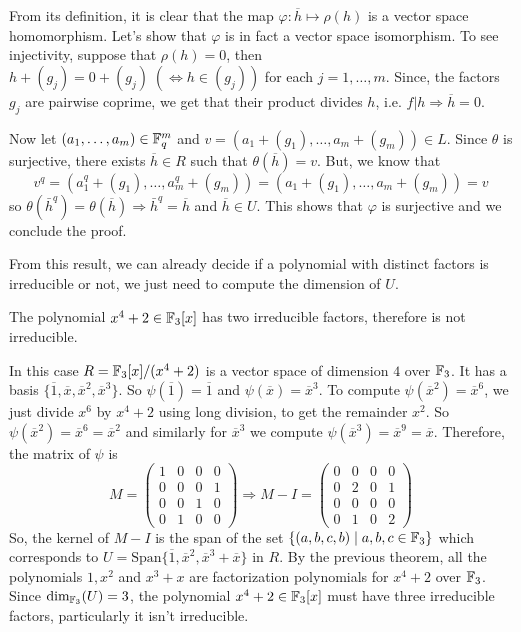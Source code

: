 From its definition, it is clear that the map $\varphi:\overline{h}\mapsto\rho(h)$ is a vector space homomorphism. Let's show that $\varphi$ is in fact a vector space isomorphism. To see injectivity, suppose that $\rho(h)=0$, then $h+(g_j)=0+(g_j)\;(\iff h\in (g_j))$ for each $j=1,\dots,m$. Since, the factors $g_j$ are pairwise coprime, we get that their product divides $h$, i.e. $f| h\Rightarrow\overline{h}=0$.\par
Now let $(a_1,\dots,a_m)\in\mathbb{F}_q^m$ and $v=(a_1+(g_1),\dots,a_m+(g_m))\in L$. Since $\theta$ is surjective, there exists $\overline{h}\in R$ such that $\theta(\overline{h})=v$. But, we know that
\begin{equation}
    v^q=(a_1^q+(g_1),\dots,a_m^q+(g_m))=(a_1+(g_1),\dots,a_m+(g_m)) = v
\end{equation}
so $\theta(\bar{h}^{q})=\theta(\overline{h})\Rightarrow \bar{h}^{q}=\overline{h}$ and $\overline{h}\in U$. This shows that $\varphi$ is surjective and we conclude the proof.\par
From this result, we can already decide if a polynomial with distinct factors is irreducible or not, we just need to compute the dimension of $U$.
\begin{dang}
    \begin{example}\label{example: x4+2 is not irreducible over F3}
        The polynomial $x^4+2\in\mathbb{F}_3[x]$ has two irreducible factors, therefore is not irreducible.
    \end{example}
\end{dang}
In this case $R=\mathbb{F}_3[x]/(x^4+2)$ is a vector space of dimension $4$ over $\mathbb{F}_3$. It has a basis $\{\overline{1},\overline{x},\overline{x}^2,\overline{x}^3\}$. So $\psi(\overline{1})=\overline{1}$ and $\psi(\overline{x})=\overline{x}^3$. To compute $\psi(\overline{x}^2)=\overline{x}^6$, we just divide $x^6$ by $x^4+2$ using long division, to get the remainder $x^2$. So $\psi(\overline{x}^2)=\overline{x}^6=\overline{x}^2$ and similarly for $\overline{x}^3$ we compute $\psi(\overline{x}^3)=\overline{x}^9=\overline{x}$. Therefore, the matrix of $\psi$ is
\begin{equation}
    M = \begin{pmatrix}
        1&0&0&0\\
        0&0&0&1\\
        0&0&1&0\\
        0&1&0&0
    \end{pmatrix}\Rightarrow
    M-I = \begin{pmatrix}
        0&0&0&0\\
        0&2&0&1\\
        0&0&0&0\\
        0&1&0&2
    \end{pmatrix}
\end{equation}
So, the kernel of $M-I$ is the span of the set $\{(a,b,c,b)\;|\;a,b,c\in\mathbb{F}_3\}$ which corresponds to $U=\text{Span}\{\overline{1},\overline{x}^2,\overline{x}^3+\overline{x}\}$ in $R$. By the previous theorem, all the polynomials $1, x^2$ and $x^3+x$ are factorization polynomials for $x^4+2$ over $\mathbb{F}_3$. Since $\text{dim}_{\mathbb{F}_3}(U)=3$, the polynomial $x^4+2\in\mathbb{F}_3[x]$ must have three irreducible factors, particularly it isn't irreducible.

